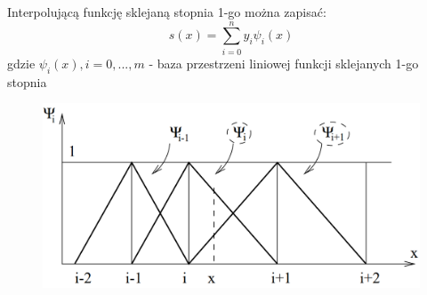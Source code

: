    \begin{frame}
   		\begin{exampleblock}{}
   			Interpolującą funkcję sklejaną stopnia 1-go można zapisać:
            \[
            	s(x)=\sum_{i=0}^{n}y_{i}\psi_{i}(x)
            \]
            gdzie $\psi_{i}(x), i=0,...,m$ - baza przestrzeni liniowej funkcji sklejanych
            1-go stopnia
   		\end{exampleblock}
        \begin{figure}[h]
			\includegraphics[width=.65\linewidth]{img/4/spline_img_3}
		\end{figure}
   \end{frame}
    
    
    
    
    
    
    
    
    
    
    
    
    
    
    
    
    
    